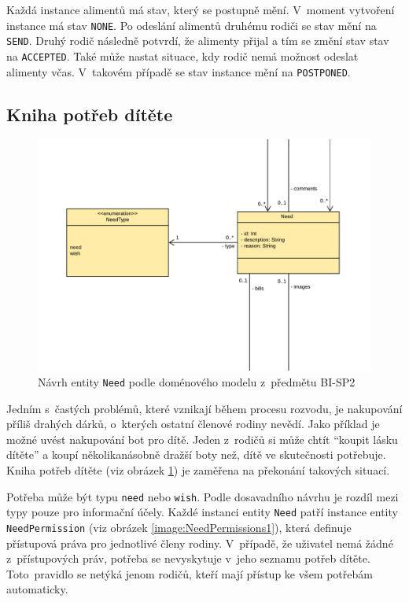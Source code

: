         Každá instance alimentů má stav, který se postupně mění. V~moment vytvoření instance má stav \verb|NONE|. Po odeslání alimentů druhému rodiči se stav mění na \verb|SEND|. Druhý rodič následně potvrdí, že alimenty přijal a tím se změní stav stav na \verb|ACCEPTED|. Také může nastat situace, kdy rodič nemá možnost odeslat alimenty včas. V~takovém případě se stav instance mění na \verb|POSTPONED|.
    
    \subsection{Kniha potřeb dítěte}\label{analyza:navrh:need}
        \begin{figure}\centering
	        \includegraphics[width=1.0\textwidth]{pdfs/Need1}
	        \caption[Návrh \texttt{Need}]{Návrh entity \texttt{Need} podle doménového modelu z~předmětu BI-SP2}\label{image:Need1}
        \end{figure}
        Jedním s~častých problémů, které vznikají během procesu rozvodu, je nakupování příliš drahých dárků, o~kterých ostatní členové rodiny nevědí. Jako příklad je možné uvést nakupování bot pro dítě. Jeden z~rodičů si může chtít \enquote{koupit lásku dítěte} a koupí několikanásobně dražší boty než, dítě ve skutečnosti potřebuje. Kniha potřeb dítěte (viz obrázek \ref{image:Need1}) je zaměřena na překonání takových situací.
        
        Potřeba může být typu \verb|need| nebo \verb|wish|. Podle dosavadního návrhu je rozdíl mezi typy pouze pro informační účely. Každé instanci entity \verb|Need| patří instance entity \verb|NeedPermission| (viz obrázek \ref{image:NeedPermissions1}), která definuje přístupová práva pro jednotlivé členy rodiny. V~případě, že uživatel nemá žádné z~přístupových práv, potřeba se nevyskytuje v~jeho seznamu potřeb dítěte. Toto~pravidlo se netýká jenom rodičů, kteří mají přístup ke všem potřebám automaticky.
       
